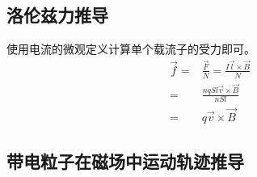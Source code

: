 \subsection{洛伦兹力推导}

使用电流的微观定义计算单个载流子的受力即可。
\begin{align*}
    \vec{f}=&\frac{\vec{F}}{N}=\frac{I\vec{l}\times\vec{B}}{N}\\
    =&\frac{nqSl\vec{v}\times\vec{B}}{nSl}\\
    =&q\vec{v}\times\vec{B}
\end{align*}

\subsection{带电粒子在磁场中运动轨迹推导}

